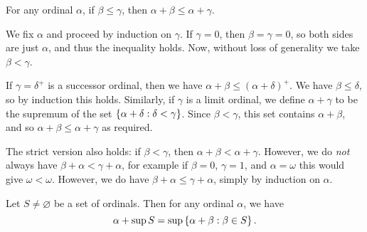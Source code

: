\documentclass{article}
\begin{document}
\begin{proposition}
	\label{ordinal-addition-respects-inequality}
    For any ordinal $\alpha$, if $\beta \leq \gamma$, then $\alpha + \beta \leq \alpha + \gamma$.
\end{proposition}

\begin{prf}
    We fix $\alpha$ and proceed by induction on $\gamma$. If $\gamma = 0$, then $\beta = \gamma = 0$, so both sides are just $\alpha$, and thus the inequality holds. Now, without loss of generality we take $\beta < \gamma$.
    
    If $\gamma = \delta^+$ is a successor ordinal, then we have $\alpha + \beta \leq (\alpha + \delta)^+$. We have $\beta \leq \delta$, so by induction this holds. Similarly, if $\gamma$ is a limit ordinal, we define $\alpha + \gamma$ to be the supremum of the set $\left\lbrace \alpha + \delta : \delta < \gamma \right\rbrace$. Since $\beta < \gamma$, this set contains $\alpha + \beta$, and so $\alpha + \beta \leq \alpha + \gamma$ as required.
\end{prf}

\begin{corollary}
	The strict version also holds: if $\beta < \gamma$, then $\alpha + \beta < \alpha + \gamma$. However, we do \textit{not} always have $\beta + \alpha < \gamma + \alpha$, for example if $\beta = 0$, $\gamma = 1$, and $\alpha = \omega$ this would give $\omega < \omega$. However, we do have $\beta + \alpha \leq \gamma + \alpha$, simply by induction on $\alpha$.
\end{corollary}

\begin{proposition}
    Let $S \neq \varnothing$ be a set of ordinals. Then for any ordinal $\alpha$, we have
    \[
	\alpha + \sup S = \sup \left\lbrace \alpha + \beta : \beta \in S \right\rbrace.
	\]
\end{proposition}
\end{document}
